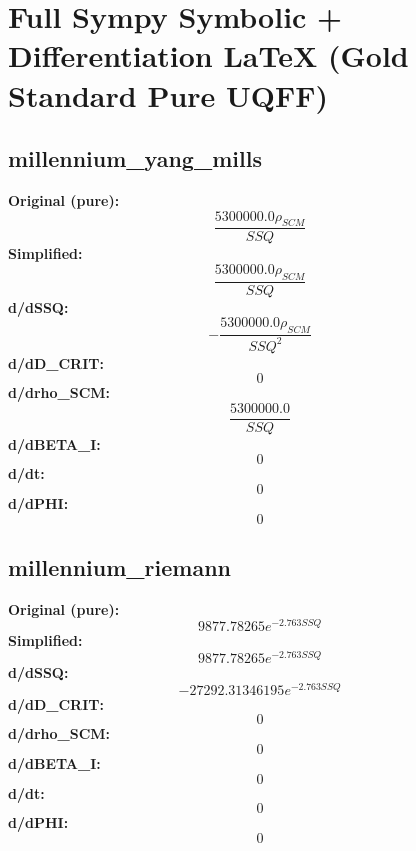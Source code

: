 \section{Full Sympy Symbolic + Differentiation LaTeX (Gold Standard Pure UQFF)}
\subsection{millennium_yang_mills}
\textbf{Original (pure):}
\begin{equation}
\frac{5300000.0 \rho_{SCM}}{SSQ}
\end{equation}
\textbf{Simplified:}
\begin{equation}
\frac{5300000.0 \rho_{SCM}}{SSQ}
\end{equation}
\textbf{d/dSSQ:}
\begin{equation}
- \frac{5300000.0 \rho_{SCM}}{SSQ^{2}}
\end{equation}
\textbf{d/dD_CRIT:}
\begin{equation}
0
\end{equation}
\textbf{d/drho_SCM:}
\begin{equation}
\frac{5300000.0}{SSQ}
\end{equation}
\textbf{d/dBETA_I:}
\begin{equation}
0
\end{equation}
\textbf{d/dt:}
\begin{equation}
0
\end{equation}
\textbf{d/dPHI:}
\begin{equation}
0
\end{equation}

\subsection{millennium_riemann}
\textbf{Original (pure):}
\begin{equation}
9877.78265 e^{- 2.763 SSQ}
\end{equation}
\textbf{Simplified:}
\begin{equation}
9877.78265 e^{- 2.763 SSQ}
\end{equation}
\textbf{d/dSSQ:}
\begin{equation}
- 27292.31346195 e^{- 2.763 SSQ}
\end{equation}
\textbf{d/dD_CRIT:}
\begin{equation}
0
\end{equation}
\textbf{d/drho_SCM:}
\begin{equation}
0
\end{equation}
\textbf{d/dBETA_I:}
\begin{equation}
0
\end{equation}
\textbf{d/dt:}
\begin{equation}
0
\end{equation}
\textbf{d/dPHI:}
\begin{equation}
0
\end{equation}

